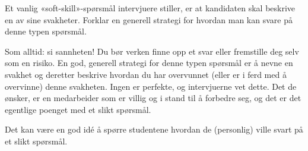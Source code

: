 

Et vanlig «soft-skill»-spørsmål intervjuere stiller, er at kandidaten skal beskrive en av sine svakheter. Forklar en generell strategi for hvordan man kan svare på denne typen spørsmål.

\vskip 50pt







Som alltid: si sannheten! Du bør verken finne opp et svar eller fremstille deg selv som en risiko. En god, generell strategi for denne typen spørsmål er å nevne en svakhet og deretter beskrive hvordan du har overvunnet (eller er i ferd med å overvinne) denne svakheten. Ingen er perfekte, og intervjuerne vet dette. Det de ønsker, er en medarbeider som er villig og i stand til å forbedre seg, og det er det egentlige poenget med et slikt spørsmål.







Det kan være en god idé å spørre studentene hvordan de (personlig) ville svart på et slikt spørsmål.




